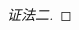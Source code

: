 \documentclass{book}[oneside]
\newtheorem{Def}{定义}[chapter]
\newtheorem{Thm}{定理}[chapter]
\begin{document}
\begin{CJK*}{UTF8}{gbsn}
\begin{proof}[证法二]
  \end{proof}




\end{CJK*}
\end{document}
